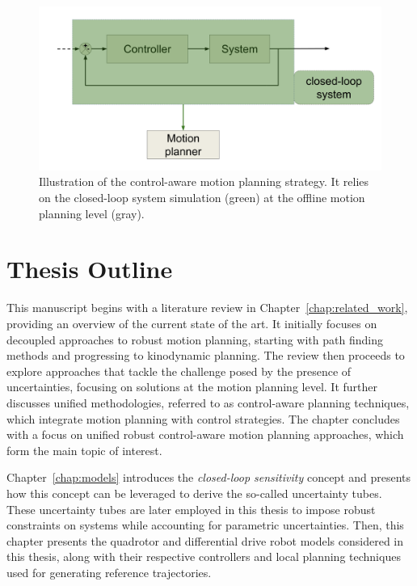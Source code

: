 \begin{figure} [htp]
    \centering
    \includegraphics[width=0.9\linewidth]{figures/intro/control-aware.png} 
    \caption{Illustration of the control-aware motion planning strategy.
    It relies on the closed-loop system simulation (green) at the offline motion planning level (gray).}%
    \label{fig:ca_strat}%
  \end{figure}

\section{Thesis Outline}

This manuscript begins with a literature review in Chapter~\ref{chap:related_work}, providing an overview of the current state of the art. 
It initially focuses on decoupled approaches to robust motion planning, starting with path finding methods and progressing to kinodynamic planning.
The review then proceeds to explore approaches that tackle the challenge posed by the presence of uncertainties, focusing on solutions at the motion planning level. 
It further discusses unified methodologies, referred to as control-aware planning techniques, which integrate motion planning with control strategies.
The chapter concludes with a focus on unified robust control-aware motion planning approaches, which form the main topic of interest.

Chapter~\ref{chap:models} introduces the \emph{closed-loop sensitivity} concept and presents how this concept can be leveraged to derive the so-called uncertainty tubes.
These uncertainty tubes are later employed in this thesis to impose robust constraints on systems while accounting for parametric uncertainties.
Then, this chapter presents the quadrotor and differential drive robot models considered in this thesis, along with their respective controllers and local planning techniques used for generating reference trajectories.

